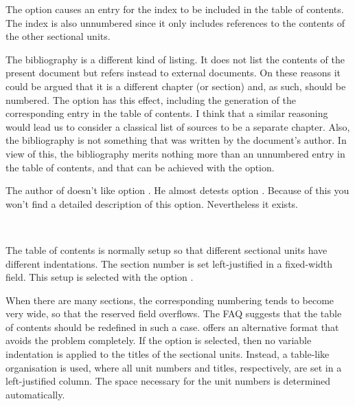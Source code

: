 The option  causes an entry for the index to be
included in the table of contents. The index is also unnumbered since
it only includes references to the contents of the other sectional
units.

The bibliography is a different kind of listing. It does not list the
contents of the present document but refers instead to external
documents. On these reasons it could be argued that it is a different
chapter (or section) and, as such, should be numbered. The option
 has this effect, including the generation of
the corresponding entry in the table of contents. I think that a
similar reasoning would lead us to consider a classical list of
sources to be a separate chapter. Also, the bibliography is not
something that was written by the document's author. In view of this,
the bibliography merits nothing more than an unnumbered entry in the
table of contents, and that can be achieved with the 
option.

The author of \KOMAScript{} doesn't like option
. He almost detests option
. Because of this you won't find a detailed
description of this option. Nevertheless it exists.
%
%
%
%
%
%


\begin{Declaration}
  \\
\end{Declaration}%
%
%
The table of contents is normally setup so
that different sectional units have different indentations. The
section number is set left-justified in a fixed-width field. This
setup is selected with the option .

When there are many sections, the corresponding numbering tends to
become very wide, so that the reserved field overflows. The FAQ
\cite{DANTE:FAQ} suggests that the table of contents should be redefined
in such a case. \KOMAScript{} offers an alternative format that avoids
the problem completely. If the option  is selected,
then no variable indentation is applied to the titles of the sectional
units. Instead, a table-like organisation is used, where all unit
numbers and titles, respectively, are set in a left-justified column.
The space necessary for the unit numbers is determined automatically.


